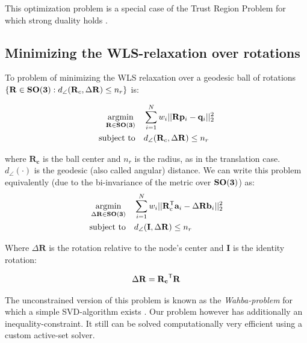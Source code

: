 This optimization problem is a special case of the Trust Region Problem for which strong duality holds \cite[Ch. 5.2, p.229]{Boyd_Vandenberghe_2004}.

\subsection{Minimizing the WLS-relaxation over rotations}

To problem of minimizing the WLS relaxation over a geodesic ball of rotations $\{\mathbf{R} \in \mathbf{SO(3)}:  d_{\angle}(\mathbf{R}_c, \Delta\mathbf{R}) \leq n_r\}$ is:

\begin{equation}
	\label{eq:tls-rwls}
	\begin{aligned}
		\operatorname*{argmin}_{\mathbf{R} \in \mathbf{SO(3)}}  \quad &\sum_{i=1}^{N} w_i ||\mathbf{R}\mathbf{p}_i - \mathbf{q}_i ||_2^2 \\
		\text{subject to} \quad &d_{\angle}(\mathbf{R}_c, \Delta\mathbf{R}) \leq n_r
	\end{aligned}
\end{equation}

where $\mathbf{R_c}$ is the ball center and $n_r$ is the radius, as in the translation case. $d_{\angle}(\cdot)$ is the geodesic (also called angular) distance.
We can write this problem equivalently (due to the bi-invariance of the metric over $\mathbf{SO(3)}$) as:
\begin{equation}
	\label{eq:tls-rwls}
	\begin{aligned}
		\operatorname*{argmin}_{\Delta \mathbf{R} \in \mathbf{SO(3)}}  \quad &\sum_{i=1}^{N} w_i ||\mathbf{R}_c^{\mathsf{T}} \mathbf{a}_i - \Delta\mathbf{R} \mathbf{b}_i ||_2^2 \\
		\text{subject to} \quad &d_{\angle}(\mathbf{I}, \Delta\mathbf{R}) \leq n_r
	\end{aligned}
\end{equation}


Where $\Delta\mathbf{R}$ is the rotation relative to the node's center and $\mathbf{I}$ is the identity rotation:  

\begin{equation}
	\begin{aligned}
		\Delta\mathbf{R} = \mathbf{R_c}^{\mathsf{T}}\mathbf{R} 
	\end{aligned}
\end{equation}

The unconstrained version of this problem is known as the \textit{Wahba-problem} for which a simple SVD-algorithm exists \cite{Kabsch-1978-Point-set-alignment} \cite{Lawrence2019APA} \cite{Least-squares-estimation-point-sets-Umeyama-1991}. Our problem however has additionally an inequality-constraint. It still can be solved computationally very efficient using a custom active-set solver.

